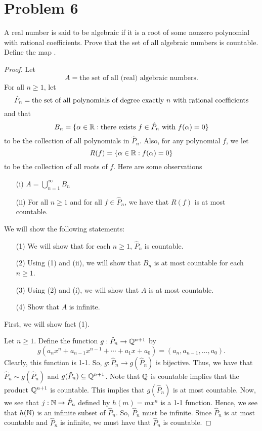 \documentclass[11pt,a4paper]{article}
\begin{document}
\section*{Problem 6} A real number is said to be algebraic if it is a root of some nonzero polynomial with rational coefficients. Prove that the set of all algebraic numbers is countable. Define the map .
\begin{proof}
    Let 
    \[  A = \text{the set of all (real) algebraic numbers}.  \]
    For all \( n \geq 1  \), let 
    \[  \hat{P}_{n} = \text{the set of all polynomials of degree exactly \( n \) with rational coefficients}  \]
    and that
    \[  {B}_{n} = \{ \alpha \in \R :  \text{there exists} \ f \in {\hat{P}}_{n} \ \text{with} \ f(\alpha) = 0  \}  \]
    to be the collection of all polynomials in \( {\hat{P}}_{n} \).
    Also, for any polynomial \( f  \), we let 
    \[  R(f) = \{ \alpha \in \mathbb{R} : f(\alpha) = 0 \} \]
    to be the collection of all roots of \( f \). Here are some observations 
    \begin{enumerate}
        \item[(i)] \( A = \bigcup_{ n=1  }^{ \infty  }  {B}_{n} \)
        \item[(ii)] For all \( n \geq 1  \) and for all \( f \in {\hat{P}}_{n} \), we have that \( R(f) \) is at most countable.
    \end{enumerate}
    We will show the following statements:
    \begin{enumerate}
        \item[(1)] We will show that for each \( n \geq 1  \), \( {\hat{P}}_{n} \) is countable.
        \item[(2)] Using (1) and (ii), we will show that \( {B}_{n}  \) is at most countable for each \( n \geq 1  \). 
        \item[(3)] Using (2) and (i), we will show that \( A  \) is at most countable.
        \item[(4)] Show that \( A  \) is infinite.
    \end{enumerate}

    First, we will show fact (1).

    Let \( n \geq 1  \). Define the function \( g: {\hat{P}}_{n} \to \mathbb{Q}^{n+1} \) by
    \[  g({a}_{n} x^{n} + {a}_{n-1} x^{n-1} + \cdots + {a}_{1} x + {a}_{0}) = ({a}_{n}, {a}_{n-1}, \dots, {a}_{0}). \] 
    Clearly, this function is 1-1. So, \( g: {\hat{P}}_{n} \to g({\hat{P}}_{n}) \) is bijective. Thus, we have that \( {\hat{P}}_{n} \sim g({\hat{P}}_{n}) \) and \( g({\hat{P}}_{n}) \subseteq \mathbb{Q}^{n+1} \). Note that \( \mathbb{Q}  \) is countable implies that the product \( \mathbb{Q}^{n+1} \) is countable. This implies that \( g({\hat{P}}_{n}) \) is at most countable. Now, we see that \( j: \mathbb{N} \to {\hat{P}}_{n} \) defined by \( h(m) = m x^{n} \) is a 1-1 function. Hence, we see that \( h(\mathbb{N}) \) is an infinite subset of \( {\hat{P}}_{n} \). So, \( {\hat{P}}_{n} \) must be infinite. Since \( {\hat{P}}_{n} \) is at most countable and \( {\hat{P}}_{n} \) is infinite, we must have that \( {\hat{P}}_{n} \) is countable. 


\end{proof}
\end{document}
